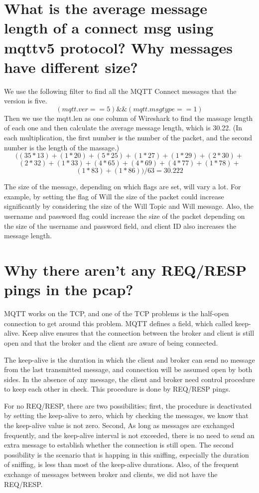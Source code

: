 \documentclass[10pt,english, openany]{book}
\begin{document}
\section{What is the average message length of a connect msg using mqttv5 protocol? Why messages have different size?}
We use the following filter to find all the MQTT  Connect messages that the version is five.
\begin{equation*}(mqtt.ver==5) \&\& (mqtt.msgtype == 1)\end{equation*}
Then we use the mqtt.len as one column of Wireshark to find the massage length of each one and then calculate the average message length, which is 30.22. (In each multiplication, the first number is the number of the packet, and the second number is the length of the massage.)
\begin{equation*}((35 * 13) + (1 * 20) +(5 * 25) + (1 * 27) + (1 * 29) + (2 * 30) + \end{equation*}
\begin{equation*}(2 * 32) + (1 * 33) + (4 * 65) + (4 * 69) + (4 * 77) + (1 * 78) + \end{equation*}
\begin{equation*}(1 * 83) + (1 * 86))/63 = 30.222 \end{equation*}


The size of the message, depending on which flags are set, will vary a lot. For example, by setting the flag of Will the size of the packet could increase significantly by considering the size of the Will Topic and Will message. Also, the username and password flag could increase the size of the packet depending on the size of the username and password field, and client ID also increases the message length.

\section{Why there aren’t any REQ/RESP pings in the pcap?}
MQTT works on the TCP, and one of the TCP problems is the half-open connection to get around this problem. MQTT defines a field, which called keep-alive. Keep alive ensures that the connection between the broker and client is still open and that the broker and the client are aware of being connected.

The keep-alive is the duration in which the client and broker can send no message from the last transmitted message, and connection will be assumed open by both sides. In the absence of any message, the client and broker need control procedure to keep each other in check. This procedure is done by REQ/RESP pings.

For no REQ/RESP, there are two possibilities; first, the procedure is deactivated by setting the keep-alive to zero, which by checking the messages, we know that the keep-alive value is not zero. Second, As long as messages are exchanged frequently, and the keep-alive interval is not exceeded, there is no need to send an extra message to establish whether the connection is still open. The second possibility is the scenario that is happing in this sniffing, especially the duration of sniffing, is less than most of the keep-alive durations.
Also, of the frequent exchange of messages between broker and clients, we did not have the REQ/RESP.
\end{document}
